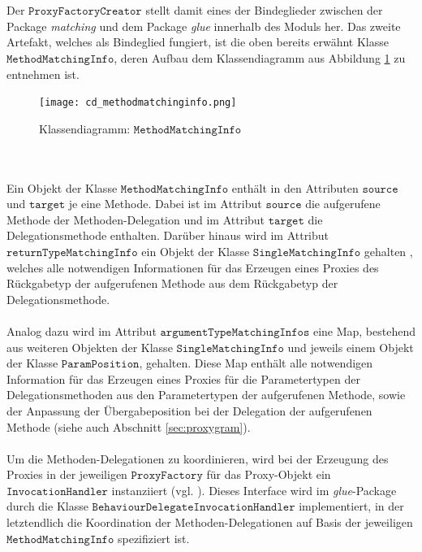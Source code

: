 \\\\
Der $\texttt{ProxyFactoryCreator}$ stellt damit eines der Bindeglieder zwischen der Package \emph{matching} und dem Package \emph{glue} innerhalb des Moduls her. Das zweite Artefakt, welches als Bindeglied fungiert, ist die oben bereits erwähnt Klasse $\texttt{MethodMatchingInfo}$, deren Aufbau dem Klassendiagramm aus Abbildung \ref{cd_methodMatchingInfo} zu entnehmen ist.
\begin{figure}[h!]
\texttt{[image: cd\_methodmatchinginfo.png]}
\caption{Klassendiagramm: $\texttt{MethodMatchingInfo}$}
\label{cd_methodMatchingInfo}
\end{figure}
\noindent
\\\\
Ein Objekt der Klasse $\texttt{MethodMatchingInfo}$ enthält in den Attributen $\texttt{source}$ und $\texttt{target}$ je eine Methode. Dabei ist im Attribut $\texttt{source}$ die aufgerufene Methode der Methoden-Delegation und im Attribut $\texttt{target}$ die Delegationsmethode enthalten. Darüber hinaus wird im Attribut $\texttt{returnTypeMatchingInfo}$ ein Objekt der Klasse $\texttt{SingleMatchingInfo}$ gehalten , welches alle notwendigen Informationen für das Erzeugen eines Proxies des Rückgabetyp der aufgerufenen Methode aus dem Rückgabetyp der Delegationsmethode.
\\\\
Analog dazu wird im Attribut $\texttt{argumentTypeMatchingInfos}$ eine Map, bestehend aus weiteren Objekten der Klasse $\texttt{SingleMatchingInfo}$ und jeweils einem Objekt der Klasse $\texttt{ParamPosition}$, gehalten. Diese Map enthält alle notwendigen Information für das Erzeugen eines Proxies für die Parametertypen der Delegationsmethoden aus den Parametertypen der aufgerufenen Methode, sowie der Anpassung der Übergabeposition bei der Delegation der aufgerufenen Methode (siehe auch Abschnitt \ref{sec:proxygram}).
\\\\
Um die Methoden-Delegationen zu koordinieren, wird bei der Erzeugung des Proxies in der jeweiligen $\texttt{ProxyFactory}$ für das Proxy-Objekt ein $\texttt{InvocationHandler}$ instanziiert (vgl. \cite{invocationhandler}). Dieses Interface wird im \emph{glue}-Package durch die Klasse $\texttt{BehaviourDelegateInvocationHandler}$ implementiert, in der letztendlich die Koordination der Methoden-Delegationen auf Basis der jeweiligen $\texttt{MethodMatchingInfo}$ spezifiziert ist.
\\\\
